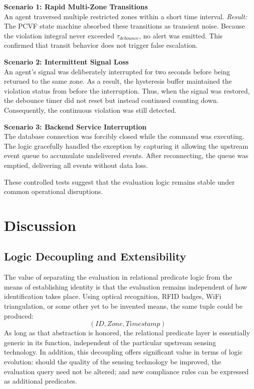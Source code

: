 \documentclass[conference]{IEEEtran}
\begin{document}
\textbf{Scenario 1: Rapid Multi-Zone Transitions}\\
An agent traversed multiple restricted zones within a short time interval.
\textit{Result:} The PCVF state machine absorbed these transitions as transient noise. Because the violation integral never exceeded $\tau_{debounce}$, no alert was emitted. This confirmed that transit behavior does not trigger false escalation.

\textbf{Scenario 2: Intermittent Signal Loss}\\
An agent’s signal was deliberately interrupted for two seconds before being returned to the same zone. As a result, the hysteresis buffer maintained the violation status from before the interruption. Thus, when the signal was restored, the debounce timer did not reset but instead continued counting down. Consequently, the continuous violation was still detected.

\textbf{Scenario 3: Backend Service Interruption}\\
The database connection was forcibly closed while the command was executing. The logic gracefully handled the exception by capturing it allowing the upstream event queue to accumulate undelivered events. After reconnecting, the queue was emptied, delivering all events without data loss.

These controlled tests suggest that the evaluation logic remains stable under common operational disruptions.

\section{Discussion}

\subsection{Logic Decoupling and Extensibility}
The value of separating the evaluation in relational predicate logic from the means of establishing identity is that the evaluation remains independent of how identification takes place. Using optical recognition, RFID badges, WiFi triangulation, or some other yet to be invented means, the same tuple could be produced:
\begin{equation}
(ID, Zone, Timestamp)
\end{equation}
As long as that abstraction is honored, the relational predicate layer is essentially generic in its function, independent of the particular upstream sensing technology. In addition, this decoupling offers significant value in terms of logic evolution: should the quality of the sensing technology be improved, the evaluation query need not be altered; and new compliance rules can be expressed as additional predicates.
\end{document}
